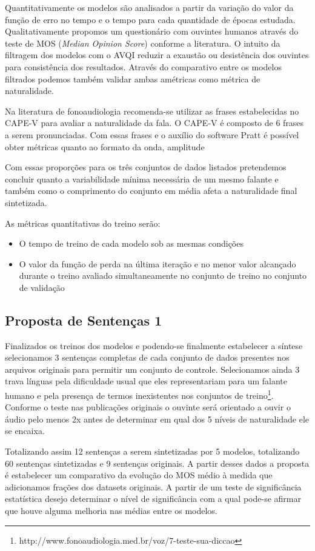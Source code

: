 \documentclass{article}
\begin{document}
Quantitativamente os modelos são analisados a partir da variação do valor da função de erro no tempo e o tempo para cada quantidade de épocas estudada.
Qualitativamente propomos um questionário com ouvintes humanos através do teste de MOS (\textit{Median Opinion Score}) conforme a literatura. 
O intuito da filtragem dos modelos com o AVQI reduzir a exaustão ou desistência dos ouvintes para consistência dos resultados.
Através do comparativo entre os modelos filtrados podemos também validar ambas amétricas como métrica de naturalidade.

Na literatura de fonoaudiologia recomenda-se utilizar as frases estabelecidas no CAPE-V para avaliar a naturalidade da fala. O CAPE-V é composto de 6 frases a serem pronunciadas. Com essas frases e o auxílio do software Pratt é possível obter métricas quanto ao formato da onda, amplitude 

Com essas proporções para os três conjuntos de dados listados pretendemos concluir  quanto a variabilidade mínima necessária de um mesmo falante e também como o comprimento do conjunto em média afeta a naturalidade final sintetizada.

As métricas quantitativas do treino serão:
\begin{itemize}
    \item O tempo de treino de cada modelo sob as mesmas condições
    \item O valor da função de perda na última iteração e no menor valor alcançado durante o treino avaliado simultaneamente no conjunto de treino no conjunto de validação
\end{itemize}

\subsection{Proposta de Sentenças 1}
Finalizados os treinos dos modelos e podendo-se finalmente estabelecer a síntese selecionamos 3 sentenças completas de cada conjunto de dados presentes nos arquivos originais para permitir um conjunto de controle. Selecionamos ainda 3 trava línguas pela dificuldade usual que eles representariam para um falante humano e pela presença de termos inexistentes nos conjuntos de treino\footnote{http://www.fonoaudiologia.med.br/voz/7-teste-sua-diccao}. Conforme o teste nas publicações originais o ouvinte será orientado a ouvir o áudio pelo menos 2x antes de determinar em qual dos 5 níveis de naturalidade ele se encaixa.

Totalizando assim 12 sentenças a serem sintetizadas por 5 modelos, totalizando 60 sentenças sintetizadas e 9 sentenças originais. A partir desses dados a proposta é estabelecer um comparativo da evolução do MOS médio à medida que adicionamos frações dos datasets originais. A partir de um teste de significância estatística desejo determinar o nível de significância com a qual pode-se afirmar que houve alguma melhoria nas médias entre os modelos.
\end{document}

